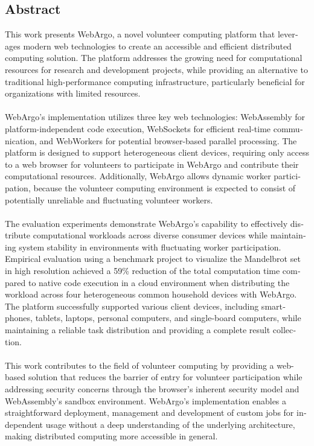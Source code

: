 \begin{otherlanguage}{american}
	\chapter*{Abstract}
	\begin{sloppypar}
		This work presents WebArgo, a novel volunteer computing platform that leverages modern web technologies to create an accessible and efficient distributed computing solution. The platform addresses the growing need for computational resources for research and development projects, while providing an alternative to traditional high-performance computing infrastructure, particularly beneficial for organizations with limited resources.
		\\~\\
		WebArgo's implementation utilizes three key web technologies: WebAssembly for platform-independent code execution, WebSockets for efficient real-time communication, and WebWorkers for potential browser-based parallel processing. The platform is designed to support heterogeneous client devices, requiring only access to a web browser for volunteers to participate in WebArgo and contribute their computational resources. Additionally, WebArgo allows dynamic worker participation, because the volunteer computing environment is expected to consist of potentially unreliable and fluctuating volunteer workers.
		\\~\\
		The evaluation experiments demonstrate WebArgo's capability to effectively distribute computational workloads across diverse consumer devices while maintaining system stability in environments with fluctuating worker participation. Empirical evaluation using a benchmark project to visualize the Mandelbrot set in high resolution achieved a 59\% reduction of the total computation time compared to native code execution in a cloud environment when distributing the workload across four heterogeneous common household devices with WebArgo. The platform successfully supported various client devices, including smartphones, tablets, laptops, personal computers, and single-board computers, while maintaining a reliable task distribution and providing a complete result collection.
		\\~\\
		This work contributes to the field of volunteer computing by providing a web-based solution that reduces the barrier of entry for volunteer participation while addressing security concerns through the browser's inherent security model and WebAssembly's sandbox environment. WebArgo's implementation enables a straightforward deployment, management and development of custom jobs for independent usage without a deep understanding of the underlying architecture, making distributed computing more accessible in general.
	\end{sloppypar}
\end{otherlanguage}
